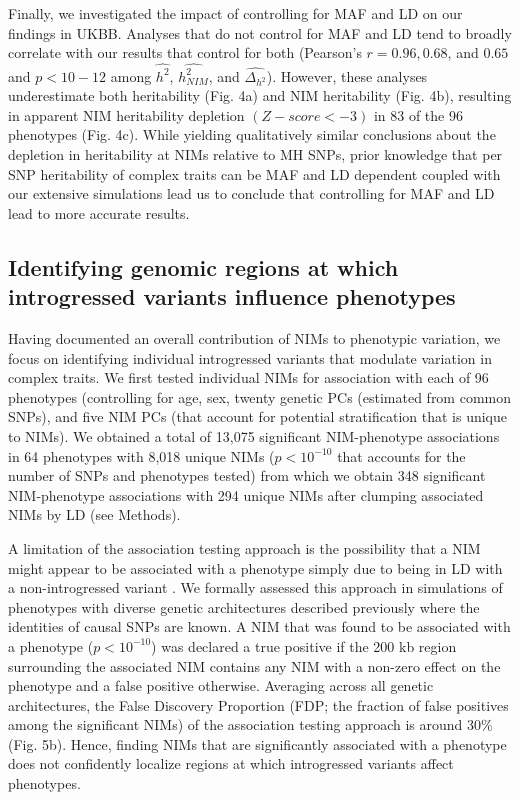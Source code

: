 Finally, we investigated the impact of controlling for MAF and LD on our findings in UKBB. Analyses that do not control for MAF and LD tend to broadly correlate with our results that control for both (Pearson’s $r = 0.96, 0.68$, and $0.65$ and $p < 10-12$ among $\hat{h^2}$, $\hat{h^2_{NIM}}$, and $\hat{\Delta_{h^2}}$). However, these analyses underestimate both heritability (Fig. 4a) and NIM heritability (Fig. 4b), resulting in apparent NIM heritability depletion $(Z-score < -3)$ in 83 of the 96 phenotypes (Fig. 4c). While yielding qualitatively similar conclusions about the depletion in heritability at NIMs relative to MH SNPs, prior knowledge that per SNP heritability of complex traits can be MAF and LD dependent \cite{evans2018comparison} coupled with our extensive simulations lead us to conclude that controlling for MAF and LD lead to more accurate results. 

\subsection{Identifying genomic regions at which introgressed variants influence phenotypes}
Having documented an overall contribution of NIMs to phenotypic variation, we focus on identifying individual introgressed variants that modulate variation in complex traits. We first tested individual NIMs for association with each of 96 phenotypes (controlling for age, sex, twenty genetic PCs (estimated from common SNPs), and five NIM PCs (that account for potential stratification that is unique to NIMs). We obtained a total of 13,075 significant NIM-phenotype associations in 64 phenotypes with 8,018 unique NIMs ($p < 10^{-10}$ that accounts for the number of SNPs and phenotypes tested)  from which we obtain 348 significant NIM-phenotype associations with 294 unique NIMs after clumping associated NIMs by LD (see Methods).
 
A limitation of the association testing approach is the possibility that a NIM might appear to be associated with a phenotype simply due to being in LD with a non-introgressed variant \cite{skov2020nature}. We formally assessed this approach in simulations of phenotypes with diverse genetic architectures described previously where the identities of causal SNPs are known. A NIM that was found to be associated with a phenotype ($p < 10^{-10}$) was declared a true positive if the 200 kb region surrounding the associated NIM contains any NIM with a non-zero effect on the phenotype and a false positive otherwise. Averaging across all genetic architectures, the False Discovery Proportion (FDP; the fraction of false positives among the significant NIMs) of the association testing approach is around 30\% (Fig. 5b). Hence, finding NIMs that are significantly associated with a phenotype does not confidently localize regions at which introgressed variants affect phenotypes.

